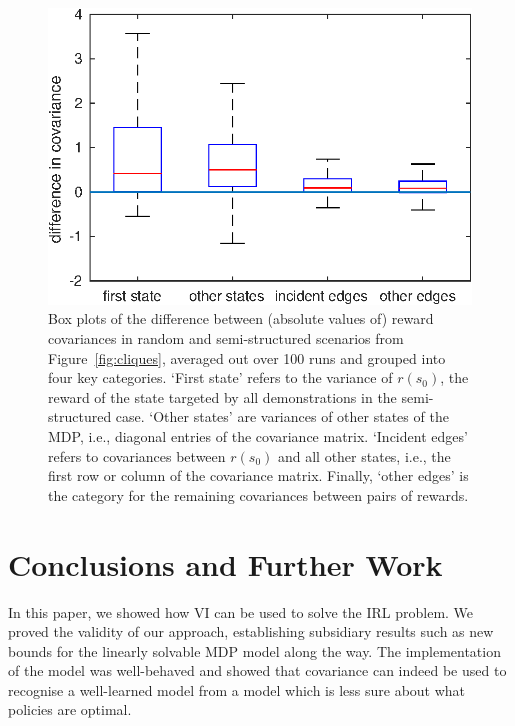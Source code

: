 \documentclass{mpaper}
\begin{document}
\begin{figure}
  \centering
  \includegraphics[width=\columnwidth]{figures/boxplots}
  \caption{Box plots of the difference between (absolute values of) reward
    covariances in random and semi-structured scenarios from
    Figure~\ref{fig:cliques}, averaged out over 100 runs and grouped into four
    key categories. `First state' refers to the variance of $r(s_0)$, the reward
    of the state targeted by all demonstrations in the semi-structured case.
    `Other states' are variances of other states of the MDP, i.e., diagonal
    entries of the covariance matrix. `Incident edges' refers to covariances
    between $r(s_0)$ and all other states, i.e., the first row or column of the
    covariance matrix. Finally, `other edges' is the category for the remaining
    covariances between pairs of rewards.}
  \label{fig:covariance_boxplots}
\end{figure}

\section{Conclusions and Further Work} \label{sec:conclusions}

In this paper, we showed how VI can be used to solve the IRL problem. We
proved the validity of our approach, establishing subsidiary results such as new
bounds for the linearly solvable MDP model along the way. The implementation of
the model was well-behaved and showed that covariance can indeed be used to
recognise a well-learned model from a model which is less sure about what
policies are optimal.
\end{document}
